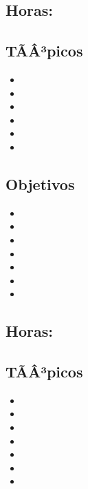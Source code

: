 \subsection*{Horas: \OSUNOHours}

\subsection*{TÃÂ³picos}
\begin{itemize}
	\item \OSUNOTopicRol
	\item \OSUNOTopicHistoria
	\item \OSUNOTopicFuncionalidad
	\item \OSUNOTopicMecanismos
	\item \OSUNOTopicTopicos
	\item \OSUNOTopicInfluencias
\end{itemize}

\subsection*{Objetivos}
\begin{itemize}
	\item \OSUNOObjUNO
	\item \OSUNOObjDOS
	\item \OSUNOObjTRES
	\item \OSUNOObjCUATRO
	\item \OSUNOObjCINCO
	\item \OSUNOObjSEIS
	\item \OSUNOObjSIETE
\end{itemize}

\subsection{\OSDOSDef}\label{sec:BOK-OS2}
\subsection*{Horas: \OSDOSHours}

\subsection*{TÃÂ³picos}
\begin{itemize}
	\item \OSDOSTopicMetodos
	\item \OSDOSTopicAbstracciones
	\item \OSDOSTopicConceptos
	\item \OSDOSTopicNecesidad
	\item \OSDOSTopicOrganizacion
	\item \OSDOSTopicInterrupciones
	\item \OSDOSTopicConcepto
\end{itemize}

